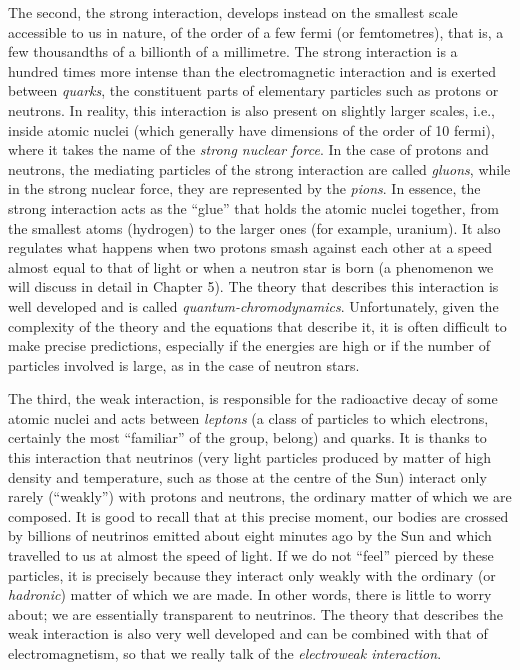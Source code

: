 The second, the strong interaction, develops instead on the smallest scale accessible to
us in nature, of the order of a few fermi (or femtometres), that is, a few thousandths
of a billionth of a millimetre. The strong interaction is a hundred times more intense
than the electromagnetic interaction and is exerted between \emph{quarks}, the
constituent parts of elementary particles such as protons or neutrons. In reality, this
interaction is also present on slightly larger scales, i.e., inside
atomic nuclei (which generally have dimensions of the order of 10
fermi), where it takes the name of the \emph{strong nuclear force}. In the case of
protons and neutrons, the mediating particles of the strong interaction are called
\emph{gluons}, while in the strong nuclear force, they are represented by
the \emph{pions}. In essence, the strong interaction acts as the ``glue''
that holds the atomic nuclei together, from the smallest atoms (hydrogen) to the larger
ones (for example, uranium). It also regulates what happens when two protons smash
against each other at a speed almost equal to that of light or when a neutron
star is born (a phenomenon we will discuss in detail in Chapter 5).
The theory that describes this interaction is well developed and is called
\emph{quantum-chromodynamics}. Unfortunately, given the
complexity of the theory and the equations that describe it, it is often difficult to
make precise predictions, especially if the energies are high or if the number of
particles involved is large, as in the case of neutron stars.

The third, the weak interaction, is responsible for the radioactive decay of some atomic
nuclei and acts between \emph{leptons} (a class of particles to which
electrons, certainly the most ``familiar'' of the group, belong) and
quarks. It is thanks to this interaction that neutrinos (very light
particles produced by matter of high density and temperature, such as those at the
centre of the Sun) interact only rarely (``weakly'') with protons and
neutrons, the ordinary matter of which we are composed. It is good to recall that at
this precise moment, our bodies are crossed by billions of neutrinos emitted about eight
minutes ago by the Sun and which travelled to us at almost the speed of light. If we do
not ``feel'' pierced by these particles, it is precisely because they interact only
weakly with the ordinary (or \emph{hadronic}) matter
of which we are made. In other words, there is little to worry about; we are essentially
transparent to neutrinos. The theory that describes the weak interaction is also very
well developed and can be combined with that of electromagnetism, so that we really talk
of the \emph{electroweak interaction}.

